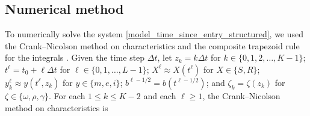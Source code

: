 \documentclass{jpmarticle}
\begin{document}
\subsection{Numerical method}

To numerically solve the system
\eqref{model_time_since_entry_structured}, we used the Crank--Nicolson
method on characteristics and the composite trapezoid rule for the
integrals \autocite{milner_1992}.  Given the time step $\Delta t$,
let $z_k = k \Delta t$
for $k \in \{0, 1, 2, \ldots, K - 1\}$;
$t^{\ell} = t_0 + \ell \Delta t$
for $\ell \in \{0, 1, \ldots, L - 1\}$;
$X^{\ell} \approx X(t^{\ell})$
for $X \in \{S, R\}$;
$y_k^{\ell} \approx y(t^{\ell}, z_k)$
for $y \in \{m, e, i\}$;
$b^{\ell - 1 / 2} = b(t^{\ell - 1 / 2})$; and
$\zeta_k = \zeta(z_k)$ for $\zeta \in \{\omega, \rho, \gamma\}$.
For each $1 \leq k \leq K - 2$ and each $\ell \geq 1$, the
Crank--Nicolson method on characteristics is
\end{document}
